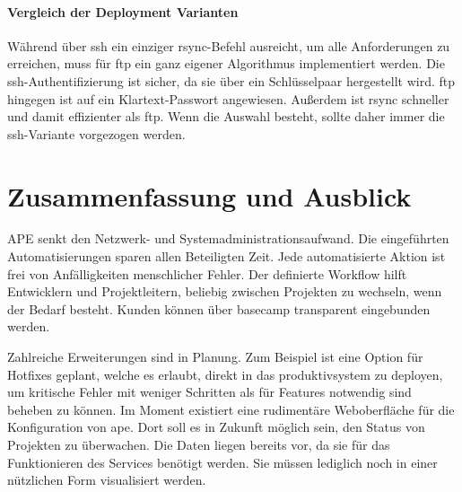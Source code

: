 
\paragraph{Vergleich der Deployment Varianten} %
\label{ssub:vergleich_der_deployment_varianten}

Während über \gls{ssh} ein einziger rsync-Befehl ausreicht, um alle Anforderungen zu erreichen, muss für \gls{ftp} ein ganz eigener Algorithmus implementiert werden. Die \gls{ssh}-Authentifizierung ist sicher, da sie über ein Schlüsselpaar hergestellt wird. \gls{ftp} hingegen ist auf ein Klartext-Passwort angewiesen. Außerdem ist rsync schneller und damit effizienter als \gls{ftp}. Wenn die Auswahl besteht, sollte daher immer die \gls{ssh}-Variante vorgezogen werden.





\vfill

\section{Zusammenfassung und Ausblick} %
\label{sec:zusammenfassung_und_ausblick}

APE senkt den Netzwerk- und Systemadministrationsaufwand. Die eingeführten Automatisierungen sparen allen Beteiligten Zeit. Jede automatisierte Aktion ist frei von Anfälligkeiten menschlicher Fehler. Der definierte Workflow hilft Entwicklern und Projektleitern, beliebig zwischen Projekten zu wechseln, wenn der Bedarf besteht. Kunden können über \gls{basecamp} transparent eingebunden werden.

Zahlreiche Erweiterungen sind in Planung. Zum Beispiel ist eine Option für Hotfixes geplant, welche es erlaubt, direkt in das \gls{produktivsystem} zu deployen, um kritische Fehler mit weniger Schritten als für Features notwendig sind beheben zu können. Im Moment existiert eine rudimentäre Weboberfläche für die Konfiguration von \gls{ape}. Dort soll es in Zukunft möglich sein, den Status von Projekten zu überwachen. Die Daten liegen bereits vor, da sie für das Funktionieren des Services benötigt werden. Sie müssen lediglich noch in einer nützlichen Form visualisiert werden.

